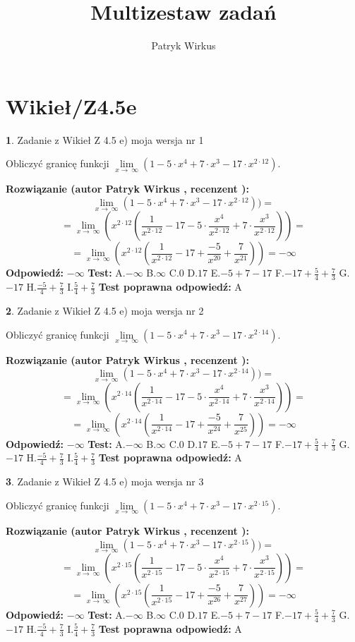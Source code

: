 \documentclass[12pt, a4paper]{article}
\title{Multizestaw zadań}
\author{Patryk Wirkus}
\date{}
\theoremstyle{definition} %
\newtheorem{zad}{}
\newcommand{\kategoria}[1]{\section{#1}}
\newcommand{\zadStart}[1]{\begin{zad}#1\newline}
\newcommand{\zadStop}{\end{zad}}
\newcommand{\rozwStart}[2]{\noindent \textbf{Rozwiązanie (autor #1 , recenzent #2): }\newline}
\newcommand{\rozwStop}{\newline}
\newcommand{\odpStart}{\noindent \textbf{Odpowiedź:}\newline}
\newcommand{\odpStop}{\newline}
\newcommand{\testStart}{\noindent \textbf{Test:}\newline}
\newcommand{\testStop}{\newline}
\newcommand{\kluczStart}{\noindent \textbf{Test poprawna odpowiedź:}\newline}
\newcommand{\kluczStop}{\newline}
\begin{document}
\maketitle

\kategoria{Wikieł/Z4.5e}


\zadStart{Zadanie z Wikieł Z 4.5 e) moja wersja nr 1}



Obliczyć granicę funkcji  $\lim\limits_{x\to\ \infty}(1 - 5 \cdot x^{4}+7 \cdot x^{3}- 17 \cdot x^{2\cdot12})$.
\zadStop
\rozwStart{Patryk Wirkus}{}
$$\lim\limits_{x\to\ \infty}(1 - 5 \cdot x^{4}+7 \cdot x^{3}- 17 \cdot x^{2\cdot12}))=$$
$$=\lim\limits_{x\to\ \infty}(x^{2\cdot12}(\frac{1}{x^{2\cdot12}}-17 -5 \cdot \frac{x^{4}}{x^{2\cdot12}}+7 \cdot \frac{x^{3}}{x^{2\cdot12}}))=$$
$$=\lim\limits_{x\to\ \infty}(x^{2\cdot12}(\frac{1}{x^{2\cdot12}}-17 + \frac{-5}{x^{20}}+ \frac{7}{x^{21}}))=-\infty$$
\rozwStop
\odpStart
$-\infty$
\odpStop
\testStart
A.$-\infty$ B.$\infty$ C.$0$ D.$17$ E.$-5 + 7 - 17$
F.$-17+\frac{5}{4}+\frac{7}{3}$ G.$-17$
H.$\frac{-5}{4}+\frac{7}{3}$
I.$\frac{5}{4}+\frac{7}{3}$
\testStop
\kluczStart
A
\kluczStop



\zadStart{Zadanie z Wikieł Z 4.5 e) moja wersja nr 2}



Obliczyć granicę funkcji  $\lim\limits_{x\to\ \infty}(1 - 5 \cdot x^{4}+7 \cdot x^{3}- 17 \cdot x^{2\cdot14})$.
\zadStop
\rozwStart{Patryk Wirkus}{}
$$\lim\limits_{x\to\ \infty}(1 - 5 \cdot x^{4}+7 \cdot x^{3}- 17 \cdot x^{2\cdot14}))=$$
$$=\lim\limits_{x\to\ \infty}(x^{2\cdot14}(\frac{1}{x^{2\cdot14}}-17 -5 \cdot \frac{x^{4}}{x^{2\cdot14}}+7 \cdot \frac{x^{3}}{x^{2\cdot14}}))=$$
$$=\lim\limits_{x\to\ \infty}(x^{2\cdot14}(\frac{1}{x^{2\cdot14}}-17 + \frac{-5}{x^{24}}+ \frac{7}{x^{25}}))=-\infty$$
\rozwStop
\odpStart
$-\infty$
\odpStop
\testStart
A.$-\infty$ B.$\infty$ C.$0$ D.$17$ E.$-5 + 7 - 17$
F.$-17+\frac{5}{4}+\frac{7}{3}$ G.$-17$
H.$\frac{-5}{4}+\frac{7}{3}$
I.$\frac{5}{4}+\frac{7}{3}$
\testStop
\kluczStart
A
\kluczStop



\zadStart{Zadanie z Wikieł Z 4.5 e) moja wersja nr 3}



Obliczyć granicę funkcji  $\lim\limits_{x\to\ \infty}(1 - 5 \cdot x^{4}+7 \cdot x^{3}- 17 \cdot x^{2\cdot15})$.
\zadStop
\rozwStart{Patryk Wirkus}{}
$$\lim\limits_{x\to\ \infty}(1 - 5 \cdot x^{4}+7 \cdot x^{3}- 17 \cdot x^{2\cdot15}))=$$
$$=\lim\limits_{x\to\ \infty}(x^{2\cdot15}(\frac{1}{x^{2\cdot15}}-17 -5 \cdot \frac{x^{4}}{x^{2\cdot15}}+7 \cdot \frac{x^{3}}{x^{2\cdot15}}))=$$
$$=\lim\limits_{x\to\ \infty}(x^{2\cdot15}(\frac{1}{x^{2\cdot15}}-17 + \frac{-5}{x^{26}}+ \frac{7}{x^{27}}))=-\infty$$
\rozwStop
\odpStart
$-\infty$
\odpStop
\testStart
A.$-\infty$ B.$\infty$ C.$0$ D.$17$ E.$-5 + 7 - 17$
F.$-17+\frac{5}{4}+\frac{7}{3}$ G.$-17$
H.$\frac{-5}{4}+\frac{7}{3}$
I.$\frac{5}{4}+\frac{7}{3}$
\testStop
\kluczStart
A
\kluczStop
\end{document}
